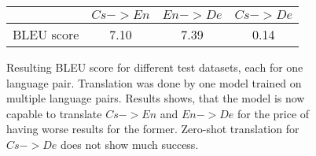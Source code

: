 \documentclass{ExcelAtFIT}
\begin{document}
\begin{figure}[h!]
    \begin{center}
        \begin{tabular}{c|c|c|c}
          & $Cs->En$ & $En->De$ & $Cs->De$ \\
          \hline
          BLEU score & 7.10 & 7.39 & 0.14 \\
          \hline
        \end{tabular}
    \end{center}
	\caption{Resulting BLEU score for different test datasets, each for one language pair. Translation was done by one model trained on multiple language pairs. Results shows, that the model is now capable to translate $Cs->En$ and $En->De$ for the price of having worse results for the former. Zero-shot translation for $Cs->De$ does not show much success.}
	\label{table:resultsMulti}
\end{figure}
\end{document}
